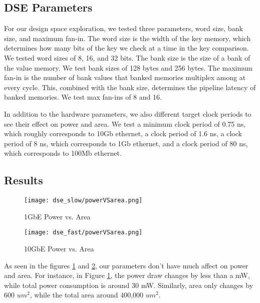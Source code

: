 \subsection{DSE Parameters}

For our design space exploration, we tested three parameters, word size,
bank size, and maximum fan-in. The word size is the width of the key
memory, which determines how many bits of the key we check at a time in the
key comparison. We tested word sizes of 8, 16, and 32 bits. The bank size is
the size of a bank of the value memory. We test bank sizes of 128 bytes and
256 bytes. The maximum fan-in is the number of bank values that banked
memories multiplex among at every cycle. This, combined with the bank size,
determines the pipeline latency of banked memories. We test max fan-ins of
8 and 16.

In addition to the hardware parameters, we also different target clock periods
to see their effect on power and area. We test a minimum clock period of 0.75 ns,
which roughly corresponds to 10Gb ethernet, a clock period of 1.6 ns,
a clock period of 8 ns, which corresponds to 1Gb ethernet, and a clock period
of 80 ns, which corresponds to 100Mb ethernet. 

\subsection{Results}

\begin{figure}
    \begin{center}
        \texttt{[image: dse\_slow/powerVSarea.png]}
        \caption{1GbE Power vs. Area}
        \label{fig:slow-pva}
    \end{center}
\end{figure}

\begin{figure}
    \begin{center}
        \texttt{[image: dse\_fast/powerVSarea.png]}
        \caption{10GbE Power vs. Area}
        \label{fig:fast-pva}
    \end{center}
\end{figure}

As seen in the figures \ref{fig:slow-pva} and \ref{fig:fast-pva}, our
parameters don't have much affect on power and area. For instance, in Figure
\ref{fig:slow-pva}, the power draw changes by less than a mW, while total
power consumption is around 30 mW. Similarly, area only changes by 600 \(um^2\),
while the total area around 400,000 \(um^2\).

